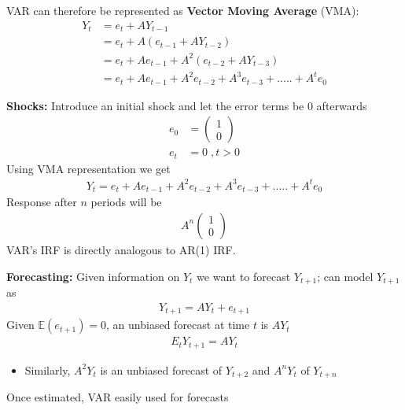 \documentclass{beamer}
\begin{document}
\begin{frame}
  VAR can therefore be represented as \textbf{Vector Moving Average} (VMA):
  \begin{align}
    Y_t &= e_t + AY_{t-1}\\ \nonumber
        &= e_t + A(e_{t-1} + AY_{t-2})\\ \nonumber
        &= e_t + Ae_{t-1} + A^2(e_{t-2} + AY_{t-3})\\ \nonumber
        &= e_t + Ae_{t-1} + A^2e_{t-2} + A^3e_{t-3} + ..... + A^te_0  
  \end{align}
\end{frame}

\begin{frame}
\textbf{Shocks:} Introduce an initial shock and let the error terms be 0 afterwards
\begin{align}  
  e_0&=\begin{pmatrix}   1 \\ 0   \end{pmatrix} \\ 
  e_t&=0\;,t>0 
\end{align}
\medskip
Using VMA representation we get 
\begin{align} 
Y_t = e_t + Ae_{t-1} + A^2e_{t-2} + A^3e_{t-3} + ..... + A^te_0 
\end{align}
\medskip
 Response after $n$ periods will be 
\begin{align}
  A^n \begin{pmatrix} 1 \\ 0  \end{pmatrix}
\end{align}
\medskip
VAR's IRF is directly analogous to AR(1) IRF.
\end{frame}

\begin{frame}
 \textbf{Forecasting:} Given information on $Y_t$ we want to forecast $Y_{t+1}$;
 can model $Y_{t+1}$ as
 \begin{align}  
  Y_{t+1} = AY_t + e_{t+1} 
  \end{align}
  Given $\mathbb{E}(e_{t+1})= 0$, an unbiased forecast at time $t$ is $AY_t$ 
  \begin{align} 
  E_tY_{t+1} = AY_t 
  \end{align}
  \begin{itemize}
    \item Similarly, $A^2Y_t$ is an unbiased forecast of $Y_{t+2}$ and $A^nY_t$ of $Y_{t+n}$
  \end{itemize}
  \medskip
  Once estimated, VAR easily used for forecasts  
\end{frame}
\end{document}
